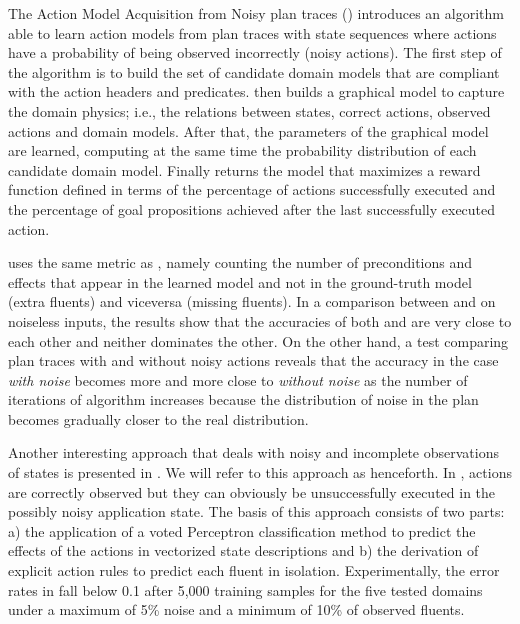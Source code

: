 The Action Model Acquisition from Noisy plan traces (\textbf{\AMAN}) \cite{zhuo2013action} introduces an algorithm able to learn action models from plan traces with \NO state sequences where actions have a probability of being observed incorrectly (noisy actions). The first step of the \AMAN algorithm is to build the set of candidate domain models that are compliant with the action headers and predicates. \AMAN then builds a graphical model to capture the domain physics; i.e., the relations between states, correct actions, observed actions and domain models. After that, the parameters of the graphical model are learned, computing at the same time the probability distribution of each candidate domain model. Finally \AMAN returns the model that maximizes a reward function defined in terms of the percentage of actions successfully executed and the percentage of goal propositions achieved after the last successfully executed action.

\AMAN uses the same metric as \LAMP, namely counting the number of preconditions and effects that appear in the learned model and not in the ground-truth model (extra fluents) and viceversa (missing fluents). In a comparison between \AMAN and \ARMS on noiseless inputs, the results show that the accuracies of both \AMAN and \ARMS are very close to each other and neither dominates the other. On the other hand, a test comparing plan traces with and without noisy actions reveals that the accuracy in the case \emph{with noise} becomes more and more close to \emph{without noise} as the number of iterations of \AMAN algorithm increases because the distribution of noise in the plan becomes gradually closer to the real distribution.

Another interesting approach that deals with noisy and incomplete observations of states is presented in \cite{MouraoZPS12}. We will refer to this approach as \textbf{\NOISTA} henceforth. In \NOISTA, actions are correctly observed but they can obviously be unsuccessfully executed in the possibly noisy application state. The basis of this approach consists of two parts: a) the application of a voted Perceptron classification method to predict the effects of the actions in vectorized state descriptions and b) the derivation of explicit \strips \texttt{} action rules to predict each fluent in isolation. Experimentally, the error rates in \NOISTA fall below 0.1 after 5,000 training samples for the five tested domains under a maximum of 5\% noise and a minimum of 10\% of observed fluents.

